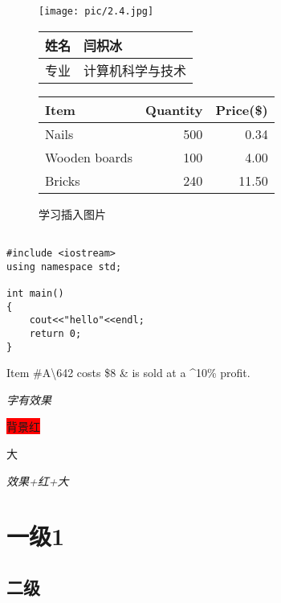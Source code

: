 \documentclass[a4paper]{article}
\begin{document}
\tableofcontents
\newpage
{}
\begin{figure}[h!]
  \centering
  \texttt{[image: pic/2.4.jpg]}
  \caption{学习插入图片}

\vspace{5em}
  \begin{tabular}{|r|l|}
  \hline
          姓名      & 闫枳冰 \\
\hline
  专业 &   计算机科学与技术\\
  \hline
\end{tabular}

  \begin{tabular}{l|r|r}
      Item &Quantity&Price(\$) \\ 
      \hline
      Nails &500&0.34\\
      Wooden boards&100&4.00\\
      Bricks&240&11.50\\
      
  \end{tabular}

\end{figure}

\begin{lstlisting}

#include <iostream>
using namespace std;

int main()
{
    cout<<"hello"<<endl;
    return 0;
}
\end{lstlisting}





Item \#A\textbackslash642 costs \$8 \& is sold at a \^{}10\% profit.

\textit{字有效果}

\colorbox{red}{背景红}

{\huge 大}

{\color{red}\textit{{\huge 效果+红+大}}}

\section{一级1}

\subsection{二级}
\end{document}

